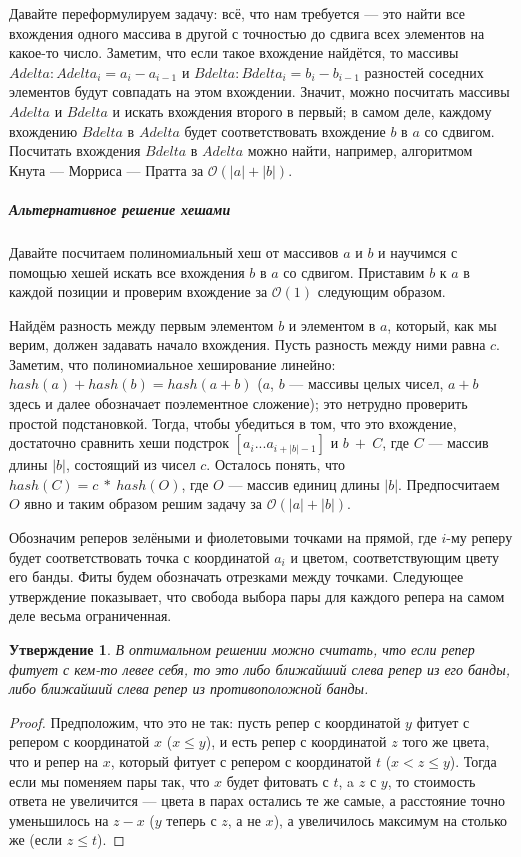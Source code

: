 \documentclass[12pt]{article}
\newtheorem*{prop}{Утверждение}
\theoremstyle{definition}
\begin{document}
Давайте переформулируем задачу: всё, что нам требуется --- это найти все вхождения одного массива в другой с точностью до сдвига всех элементов на какое-то число. Заметим, что если такое вхождение найдётся, то массивы $Adelta: Adelta_i = a_i - a_{i - 1}$ и $Bdelta: Bdelta_i = b_i - b_{i - 1}$ разностей соседних элементов будут совпадать на этом вхождении. Значит, можно посчитать массивы $Adelta$ и $Bdelta$ и искать вхождения второго в первый; в самом деле, каждому вхождению $Bdelta$ в $Adelta$ будет соответствовать вхождение $b$ в $a$ со сдвигом. Посчитать вхождения $Bdelta$ в $Adelta$ можно найти, например, алгоритмом Кнута --- Морриса --- Пратта за $\mathcal{O}(|a| + |b|)$.

	\subparagraph{Альтернативное решение хешами}
	Давайте посчитаем полиномиальный хеш от массивов $a$ и $b$ и научимся с помощью хешей искать все вхождения $b$ в $a$ со сдвигом.  Приставим $b$ к $a$ в каждой позиции и проверим вхождение за $\mathcal{O}(1)$ следующим образом.
    
	Найдём разность между первым элементом $b$ и элементом в $a$, который, как мы верим, должен задавать начало вхождения. Пусть разность между ними равна $c$. Заметим, что полиномиальное хеширование линейно: $hash(a) + hash(b) = hash(a + b)$ ($a$, $b$ --- массивы целых чисел, $a + b$ здесь и далее обозначает поэлементное сложение); это нетрудно  проверить простой подстановкой. Тогда, чтобы убедиться в том, что это вхождение, достаточно сравнить хеши подстрок $[a_i...a_{i + |b| - 1}]$ и $b \ + \ C$, где $C$ --- массив длины $|b|$, состоящий из чисел $c$. Осталось понять, что $hash(C) = c  \ * \ hash(O)$, где $O$ --- массив единиц длины $|b|$. Предпосчитаем $O$ явно и таким образом решим задачу за $\mathcal{O}(|a| + |b|)$.
    

Обозначим реперов зелёными и фиолетовыми точками на прямой, где $i$-му реперу будет соответствовать точка с координатой $a_i$ и цветом, соответствующим цвету его банды. Фиты будем обозначать отрезками между точками. Следующее утверждение показывает, что свобода выбора пары для каждого репера на самом деле весьма ограниченная.

\begin{prop}
В оптимальном решении можно считать, что если репер фитует с кем-то левее себя, то это либо ближайший слева репер из его банды, либо ближайший слева репер из противоположной банды.
\end{prop}
\begin{proof}
Предположим, что это не так: пусть репер с координатой $y$ фитует с репером с координатой $x$ ($x \le y$), и есть репер с координатой $z$ того же цвета, что и репер на $x$, который фитует с репером с координатой $t$ ($x < z \le y$). Тогда если мы поменяем пары так, что $x$ будет фитовать с $t$, a $z$ с $y$, то стоимость ответа не увеличится --- цвета в парах остались те же самые, а расстояние точно уменьшилось на $z - x$ ($y$ теперь с $z$, а не $x$), а увеличилось максимум на столько же (если $z \le t$).
\end{proof}
\end{document}
